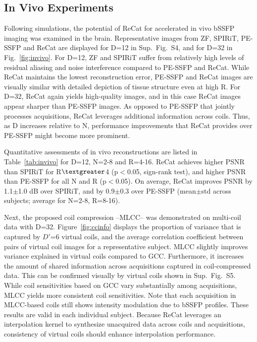 \documentclass[11pt, onecolumn]{article}
\begin{document}
\subsection*{In Vivo Experiments}
Following simulations, the potential of ReCat for accelerated in vivo bSSFP imaging was examined in the brain. Representative images from ZF, SPIRiT, PE-SSFP and ReCat are displayed for D=12 in Sup.~Fig.~S4, and for D=32 in Fig.~\ref{fig:invivo}. For D=12, ZF and SPIRiT suffer from relatively high levels of residual aliasing and noise interference compared to PE-SSFP and ReCat. While ReCat maintains the lowest reconstruction error, PE-SSFP and ReCat images are visually similar with detailed depiction of tissue structure even at high R. For D=32, ReCat again yields high-quality images, and in this case ReCat images appear sharper than PE-SSFP images. As opposed to PE-SSFP that jointly processes acquisitions, ReCat leverages additional information across coils. Thus, as D increases relative to N, performance improvements that ReCat provides over PE-SSFP might become more prominent.

Quantitative assessments of in vivo reconstructions are listed in Table~\ref{tab:invivo} for D=12, N=2-8 and R=4-16. ReCat achieves higher PSNR than SPIRiT for R$\textgreater$4 (p$<$0.05, sign-rank test), and higher PSNR than PE-SSFP for all N and R (p$<$0.05). On average, ReCat improves PSNR by 1.1$\pm$1.0 dB over SPIRiT, and by 0.9$\pm$0.3 over PE-SSFP (mean$\pm$std across subjects; average for N=2-8, R=8-16). 

Next, the proposed coil compression –MLCC– was demonstrated on multi-coil data with D=32. Figure~\ref{fig:ccinfo} displays the proportion of variance that is captured by $D'$=6 virtual coils, and the average correlation coefficient between pairs of virtual coil images for a representative subject. MLCC slightly improves variance explained in virtual coils compared to GCC. Furthermore, it increases the amount of shared information across acquisitions captured in coil-compressed data. This can be confirmed visually by virtual coils shown in Sup.~Fig.~S5. While coil sensitivities based on GCC vary substantially among acquisitions, MLCC yields more consistent coil sensitivities. Note that each acquisition in MLCC-based coils still shows intensity modulation due to bSSFP profiles. These results are valid in each individual subject. Because ReCat leverages an interpolation kernel to synthesize unacquired data across coils and acquisitions, consistency of virtual coils should enhance interpolation performance. 
\end{document}
